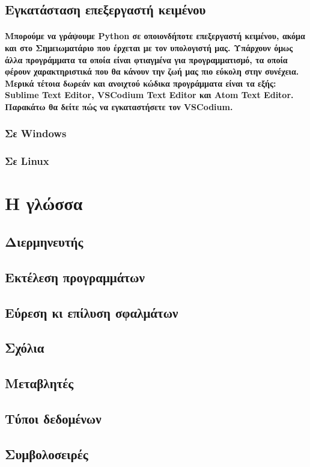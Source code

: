 \documentclass[a4paper,10pt]{report}
\begin{document}
\subsection{Εγκατάσταση επεξεργαστή κειμένου}
\paragraph{
    Μπορούμε να γράψουμε Python σε οποιονδήποτε επεξεργαστή κειμένου, ακόμα και
    στο Σημειωματάριο που έρχεται με τον υπολογιστή μας. Υπάρχουν όμως άλλα
    προγράμματα τα οποία είναι φτιαγμένα για προγραμματισμό, τα οποία φέρουν
    χαρακτηριστικά που θα κάνουν την ζωή μας πιο εύκολη στην συνέχεια. Μερικά
    τέτοια δωρεάν και ανοιχτού κώδικα προγράμματα είναι τα εξής:
    Sublime Text Editor, VSCodium Text Editor και Atom Text Editor. Παρακάτω
    θα δείτε πώς να εγκαταστήσετε τον VSCodium.
}
\subsubsection{Σε Windows}
\subsubsection{Σε Linux}
\section{Η γλώσσα}
\subsection{Διερμηνευτής}
\subsection{Εκτέλεση προγραμμάτων}
\subsection{Εύρεση κι επίλυση σφαλμάτων}
\subsection{Σχόλια}
\subsection{Μεταβλητές}
\subsection{Τύποι δεδομένων}
\subsection{Συμβολοσειρές}
\end{document}
